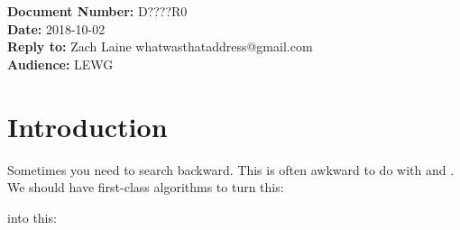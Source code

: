 \documentclass{article}
\begin{document}
\title{\textbf{\Large {}}}
\date{}
{\let\newpage\relax\maketitle}

\noindent\textbf{Document Number:} D????R0\\
\textbf{Date:} 2018-10-02\\
\textbf{Reply to:} Zach Laine whatwasthataddress@gmail.com\\
\textbf{Audience:} LEWG

\section{Introduction}

\label{sec:intro}

Sometimes you need to search backward.  This is often awkward to do with
 and .  We should have first-class
algorithms to turn this:



into this:





\end{document}
